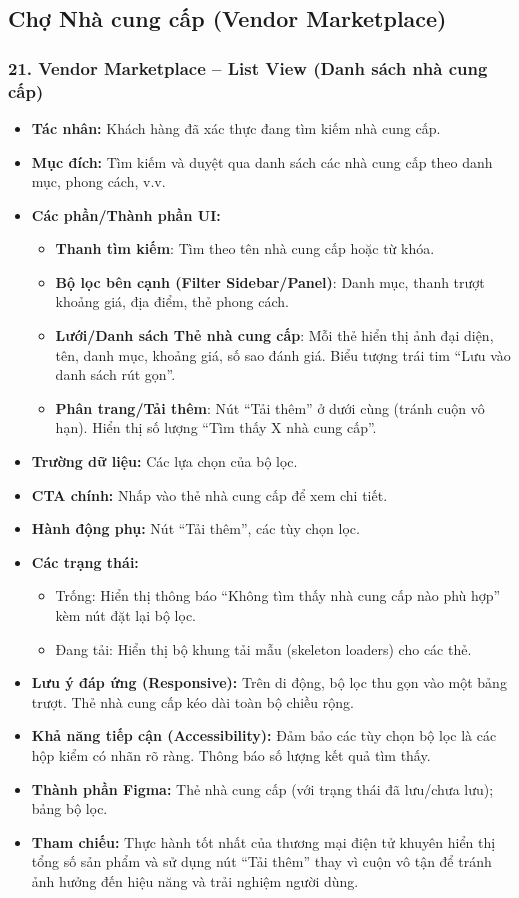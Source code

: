 \documentclass[11pt,a4paper]{article}
\begin{document}
\subsection{Chợ Nhà cung cấp (Vendor Marketplace)}

\subsubsection{21. Vendor Marketplace – List View (Danh sách nhà cung cấp)}
\begin{itemize}
    \item \textbf{Tác nhân:} Khách hàng đã xác thực đang tìm kiếm nhà cung cấp.
    \item \textbf{Mục đích:} Tìm kiếm và duyệt qua danh sách các nhà cung cấp theo danh mục, phong cách, v.v.
    \item \textbf{Các phần/Thành phần UI:}
    \begin{itemize}
        \item \textbf{Thanh tìm kiếm}: Tìm theo tên nhà cung cấp hoặc từ khóa.
        \item \textbf{Bộ lọc bên cạnh (Filter Sidebar/Panel)}: Danh mục, thanh trượt khoảng giá, địa điểm, thẻ phong cách.
        \item \textbf{Lưới/Danh sách Thẻ nhà cung cấp}: Mỗi thẻ hiển thị ảnh đại diện, tên, danh mục, khoảng giá, số sao đánh giá. Biểu tượng trái tim ``Lưu vào danh sách rút gọn''.
        \item \textbf{Phân trang/Tải thêm}: Nút ``Tải thêm'' ở dưới cùng (tránh cuộn vô hạn). Hiển thị số lượng ``Tìm thấy X nhà cung cấp''.
    \end{itemize}
    \item \textbf{Trường dữ liệu:} Các lựa chọn của bộ lọc.
    \item \textbf{CTA chính:} Nhấp vào thẻ nhà cung cấp để xem chi tiết.
    \item \textbf{Hành động phụ:} Nút ``Tải thêm'', các tùy chọn lọc.
    \item \textbf{Các trạng thái:}
    \begin{itemize}
        \item Trống: Hiển thị thông báo ``Không tìm thấy nhà cung cấp nào phù hợp'' kèm nút đặt lại bộ lọc.
        \item Đang tải: Hiển thị bộ khung tải mẫu (skeleton loaders) cho các thẻ.
    \end{itemize}
    \item \textbf{Lưu ý đáp ứng (Responsive):} Trên di động, bộ lọc thu gọn vào một bảng trượt. Thẻ nhà cung cấp kéo dài toàn bộ chiều rộng.
    \item \textbf{Khả năng tiếp cận (Accessibility):} Đảm bảo các tùy chọn bộ lọc là các hộp kiểm có nhãn rõ ràng. Thông báo số lượng kết quả tìm thấy.
    \item \textbf{Thành phần Figma:} Thẻ nhà cung cấp (với trạng thái đã lưu/chưa lưu); bảng bộ lọc.
    \item \textbf{Tham chiếu:} Thực hành tốt nhất của thương mại điện tử khuyên hiển thị tổng số sản phẩm và sử dụng nút ``Tải thêm'' thay vì cuộn vô tận để tránh ảnh hưởng đến hiệu năng và trải nghiệm người dùng.
\end{itemize}
\end{document}
